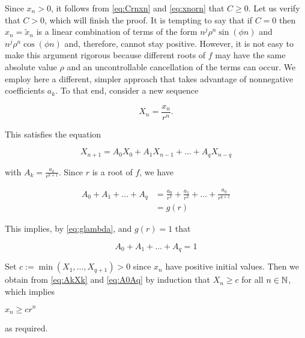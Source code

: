 \begin{theorem}
\begin{pf}
\begin{enumerate}[(a)]
Since $x_n > 0$, it follows from \ref{eq:Crnxn} and \ref{eq:xnorn} that $C \geq 0$. Let us verify that $C > 0$, which will finish the proof. It is tempting to say that if $C = 0$ then $x_n = \tilde{x}_n$ is a linear combination of terms of the form $n^j\rho^n \sin(\phi n)$ and $n^j\rho^n \cos(\phi n)$ and, therefore, cannot stay positive. However, it is not easy to make this argument rigorous because different roots of $f$ may have the same absolute value $\rho$ and an uncontrollable cancellation of the terms can occur. We employ here a different, simpler approach that takes advantage of nonnegative coefficients $a_k$. To that end, consider a new sequence

$$ X_n = \frac{x_n}{r^n}.$$

This satisfies the equation

\begin{equation} \label{eq:AkXk}
X_{n+1}=A_0X_0+A_1X_{n-1}+\dots+A_qX_{n-q}
\end{equation}

with $A_k = \frac{a_k}{r^{k+1}}$. Since $r$ is a root of $f$, we have

\begin{align}
  A_0+A_1+\dots+A_q &= \frac{a_0}{r^{1}}+\frac{a_1}{r^{2}}+\dots+\frac{a_q}{r^{q+1}} \nonumber \\ 
                     &= g(r) \nonumber 
\end{align}

This implies, by \ref{eq:glambda}, and $g(r)=1$ that 

\begin{equation}
     A_0+A_1+\dots+A_q = 1 \label{eq:A0Aq}
\end{equation}

Set $c := \min(X_1, \dots , X_{q+1}) > 0$ since $x_n$ have positive initial values. Then we obtain from \ref{eq:AkXk} and \ref{eq:A0Aq} by induction that
$X_n \geq c$ for all $n \in \mathbb N$, which implies

$x_n\geq cr^n$

as required.
\end{enumerate}
\end{pf}
\end{theorem}

